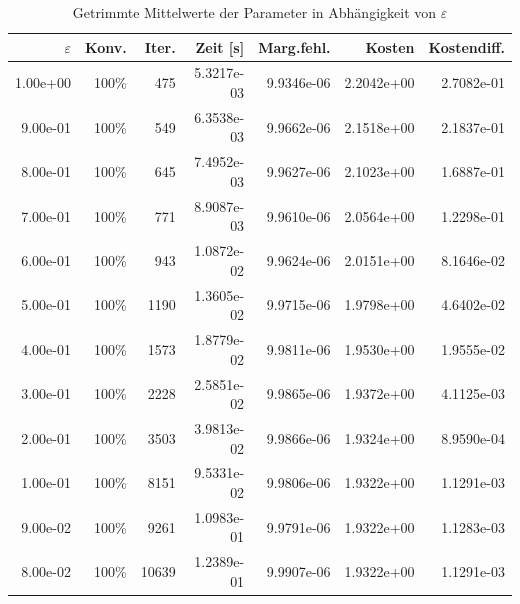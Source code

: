\begin{table}[htbp]
\caption{Getrimmte Mittelwerte der Parameter in Abhängigkeit von $\varepsilon$}
\label{tab:Parametertest64_tol1e-05}
\small
\centering
{}
\begin{tabular}{rrrrrrr}
\toprule
$\varepsilon$ & Konv. & Iter. & Zeit [s] & Marg.fehl. & Kosten & Kostendiff. \\
\midrule
1.00e+00 & 100\% & 475 & 5.3217e-03 & 9.9346e-06 & 2.2042e+00 & 2.7082e-01 \\
9.00e-01 & 100\% & 549 & 6.3538e-03 & 9.9662e-06 & 2.1518e+00 & 2.1837e-01 \\
8.00e-01 & 100\% & 645 & 7.4952e-03 & 9.9627e-06 & 2.1023e+00 & 1.6887e-01 \\
7.00e-01 & 100\% & 771 & 8.9087e-03 & 9.9610e-06 & 2.0564e+00 & 1.2298e-01 \\
6.00e-01 & 100\% & 943 & 1.0872e-02 & 9.9624e-06 & 2.0151e+00 & 8.1646e-02 \\
5.00e-01 & 100\% & 1190 & 1.3605e-02 & 9.9715e-06 & 1.9798e+00 & 4.6402e-02 \\
4.00e-01 & 100\% & 1573 & 1.8779e-02 & 9.9811e-06 & 1.9530e+00 & 1.9555e-02 \\
3.00e-01 & 100\% & 2228 & 2.5851e-02 & 9.9865e-06 & 1.9372e+00 & 4.1125e-03 \\
2.00e-01 & 100\% & 3503 & 3.9813e-02 & 9.9866e-06 & 1.9324e+00 & 8.9590e-04 \\
1.00e-01 & 100\% & 8151 & 9.5331e-02 & 9.9806e-06 & 1.9322e+00 & 1.1291e-03 \\
9.00e-02 & 100\% & 9261 & 1.0983e-01 & 9.9791e-06 & 1.9322e+00 & 1.1283e-03 \\
8.00e-02 & 100\% & 10639 & 1.2389e-01 & 9.9907e-06 & 1.9322e+00 & 1.1291e-03 \\
\bottomrule
\end{tabular}
\end{table}
